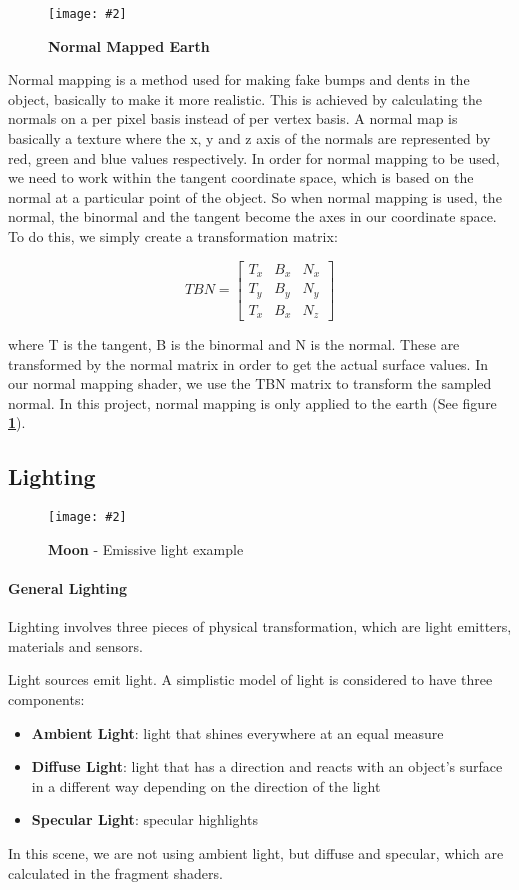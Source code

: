 \documentclass[10pt, a4paper]{article}
\newcommand{\figuremacro}[5]{
    \begin{figure}[#1]
        \centering
        \texttt{[image: \#2]}
        \caption[#3]{\textbf{#3}#4}
        \label{fig:#2}
    \end{figure}
}
\begin{document}
	\figuremacro{H}{Earth}{Normal Mapped Earth}{ }{1.0}
	
	Normal mapping is a method used for making fake bumps and dents in the object, basically to make it more realistic. This is achieved by calculating the normals on a per pixel basis instead of per vertex basis. A normal map is basically a texture  where the x, y and z axis of the normals are represented by red, green and blue values respectively. In order for normal mapping to be used, we need to work within the tangent coordinate space, which is based on the normal at a particular point of the object. So when normal mapping is used, the normal, the binormal and the tangent become the axes in our coordinate space. To do this, we simply create a transformation matrix:
	
	    \[
	    TBN=
	    \begin{bmatrix}
	    T_x & B_x & N_x  \\
	    T_y & B_y & N_y  \\
	    T_x & B_x & N_z
	    \end{bmatrix}
	    \]
	    
	where T is the tangent, B is the binormal and N is the normal. These are transformed by the normal matrix in order to get the actual surface values. In our normal mapping shader, we use the TBN matrix to transform the sampled normal. In this project, normal mapping is only applied to the earth (See figure \textbf{\ref{fig:Earth}}).
	
\subsection{Lighting}

	\figuremacro{H}{Moon}{Moon}{ - Emissive light example}{1.0}

	\paragraph{General Lighting} Lighting involves three pieces of physical transformation, which are light emitters, materials and sensors. 
	
	Light sources emit light. A simplistic model of light is considered to have three components:
		\begin{itemize}
			\item \textbf{Ambient Light}: light that shines everywhere at an equal measure
			\item \textbf{Diffuse Light}: light that has a direction and reacts with an object's surface in a different  way depending on the direction of the light
			\item \textbf{Specular Light}: specular highlights
		\end{itemize}
	In this scene, we are not using ambient light, but diffuse and specular, which are calculated in the fragment shaders.
	
\end{document}

